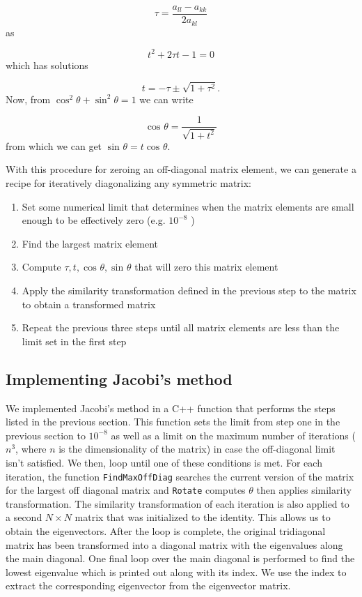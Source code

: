 \documentclass[10pt,showpacs,preprintnumbers,footinbib,amsmath,amssymb,aps,prl,twocolumn,groupedaddress,superscriptaddress,showkeys]{revtex4-1}
\newcommand{\costa}[1]{%
	\ensuremath{\cos ^{#1} {\theta}} }
\newcommand{\sinta}[1]{%
	\ensuremath{\sin ^{#1} {\theta}} }
\newcommand{\pwrten}[1]{%
	\ensuremath{10^{#1}} }
\begin{document}
{\begin{equation*}
	\tau = \frac{a _{ll} - a _{kk}}{2 a _{kl}}
\end{equation*}
as

\begin{equation*}
	t ^2  + 2 \tau t - 1 = 0
\end{equation*}
which has solutions

\begin{equation*}
	t = - \tau \pm \sqrt{1 + \tau ^2}.
\end{equation*}
Now, from $\costa{2} + \sinta{2} = 1$ we can write

\begin{equation*}
	\costa{} = \frac{1}{ \sqrt{1 + t ^2}}
\end{equation*}
from which we can get $\sinta{} = t \costa{}$.

With this procedure for zeroing an off-diagonal matrix element, we can generate
a recipe for iteratively diagonalizing any symmetric matrix:

\begin{enumerate}
	\item Set some numerical limit that determines when the matrix elements
	are small enough to be effectively zero (e.g. \pwrten{-8})
	\item Find the largest matrix element
	\item Compute $\tau,t,\costa{},\sinta{}$ that will zero this matrix element
	\item Apply the similarity transformation defined in the previous step to the
	matrix to obtain a transformed matrix
	\item Repeat the previous three steps until all matrix elements are less than
	the limit set in the first step
\end{enumerate}

\subsection{Implementing Jacobi's method}

We implemented Jacobi's method in a C++ function that performs the steps listed
in the previous section. This function sets the limit from step one in the previous
section to \pwrten{-8} as well as a limit on the maximum number of iterations ($n^3$,
where $n$ is the dimensionality of the matrix) in case the off-diagonal limit
isn't satisfied. We then, loop until one of these conditions is met. For each iteration,
the function \texttt{FindMaxOffDiag} searches the current version of the matrix for
the largest off diagonal matrix and \texttt{Rotate} computes $\theta$ then applies
similarity transformation. The similarity transformation of each iteration is also applied
to a second $N \times N$ matrix that was initialized to the identity. This allows us to
obtain the eigenvectors. After the loop is complete, the original tridiagonal matrix
has been transformed into a diagonal matrix with the eigenvalues along the main
diagonal. One final loop over the main diagonal is performed to find the lowest
eigenvalue which is printed out along with its index. We use the index to extract
the corresponding eigenvector from the eigenvector matrix.


}
\end{document}
